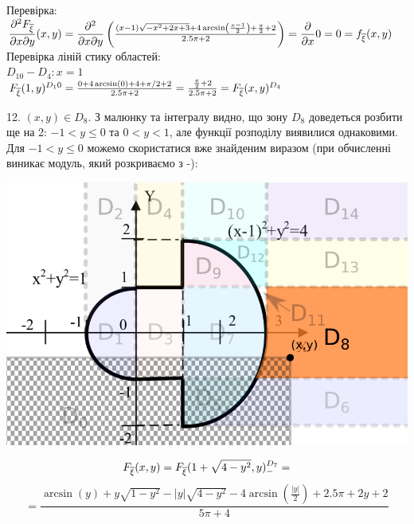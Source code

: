 \documentclass[14pt,a4paper]{scrartcl}
\theoremstyle{definition}
\theoremstyle{remark}
\theoremstyle{definition}
\theoremstyle{definition}
\begin{document}
Перевірка:\\
$\dfrac{\partial^2 F_{\overline{\xi}}}{\partial x \partial y}(x,y) =
\dfrac{\partial^2}{\partial x \partial y} \left( \frac{\left(x-1\right)\sqrt{-x^2+2x+3}+4\arcsin\left(\frac{x-1}{2}\right)+\frac{{\pi}}{2}+2}{2.5\pi + 2}
\right) = \dfrac{\partial}{ \partial x} 0 = 0=f_{\overline{\xi}} (x,y)$\\

Перевірка ліній стику областей:\\
$D_{10} - D_4 : x = 1$\\
$ F_{\overline{\xi}} (1,y)^{D_10} = \frac{0+4\arcsin(0)+4 +\pi/2 + 2}{2.5\pi + 2} = \frac{ \frac{\pi}{2} + 2  }{2.5\pi + 2}  = F_{\overline{\xi}} (x,y)^{D_4}$\\
\newpage



12. $(x,y) \in D_8$.
З малюнку та інтегралу видно, що зону $D_8$ доведеться розбити ще на 2: $-1<y \leq 0$ та $ 0< y < 1$, але функції розподілу виявилися однаковими. Для $-1<y \leq 0$ можемо скористатися вже знайденим виразом (при обчисленні виникає модуль, який розкриваємо з -):
\begin{center} \includegraphics[scale=0.34]{assets/zone945.png} \end{center}
$$
F_{\overline{\xi}} (x,y) =  F_{\overline{\xi}} (1+\sqrt{4 - y^2}, y)^{D_7}_{-} =
$$
$$
= \dfrac{\arcsin\left(y\right)+y\sqrt{1-y^2} - \left|  y \right|\sqrt{4-y^2}-4\arcsin\left(\frac{ \left|  y \right|}{2}\right) + 2.5\pi + 2y + 2}{5\pi + 4}
$$
\end{document}

